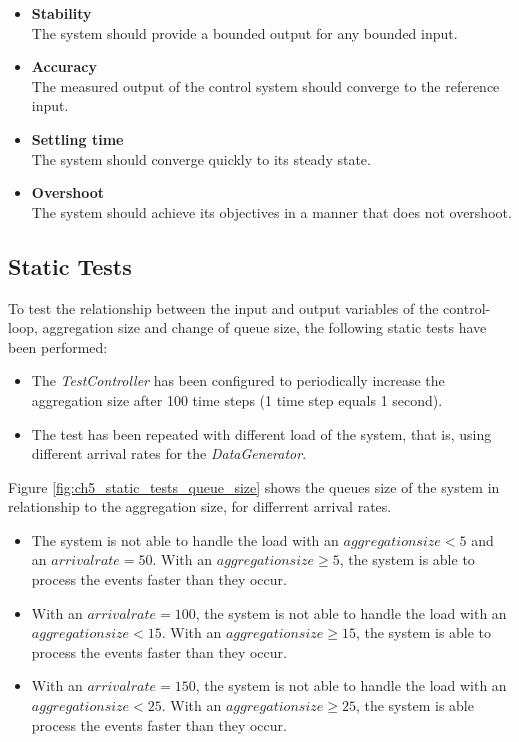 \begin{itemize}
	\item \textbf{Stability}\\
	The system should provide a bounded output for any bounded input.
	\item \textbf{Accuracy}\\
	The measured output of the control system should converge to the reference input.
	\item \textbf{Settling time}\\
	The system should converge quickly to its steady state.
	\item \textbf{Overshoot}\\
	The system should achieve its objectives in a manner that does not overshoot.
\end{itemize}

\subsection{Static Tests}
\label{sec:ch05_static_tests}
To test the relationship between the input and output variables of the control-loop, aggregation size and change of queue size, the following static tests have been performed:
\begin{itemize}
	\item The \emph{TestController} has been configured to periodically increase the aggregation size after 100 time steps (1 time step equals 1 second).
	\item The test has been repeated with different load of the system, that is, using different arrival rates for the \emph{DataGenerator}.
\end{itemize}

Figure \ref{fig:ch5_static_tests_queue_size} shows the queues size of the system in relationship to the aggregation size, for differrent arrival rates. 

\begin{itemize}
	\item The system is not able to handle the load with an $aggregation size < 5$ and an $arrival rate = 50$. With an $aggregation size \geq 5$, the system is able to process the events faster than they occur.
	\item With an $arrival rate = 100$, the system is not able to handle the load with an $aggregation size < 15$. With an $aggregation size \geq 15$, the system is able to process the events faster than they occur.
	\item With an $arrival rate = 150$, the system is not able to handle the load with an $aggregation size < 25$. With an $aggregation size \geq 25$, the system is able process the events faster than they occur.
\end{itemize}

